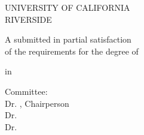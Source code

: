 \begin{titlepage}
    \begin{center}
    \null
        \vspace{0.2in} %
    
        UNIVERSITY OF CALIFORNIA \\
        RIVERSIDE
        
        \vfill
        
        \Title 
        
        \vspace{0.5in}
        
        A \DocumentType submitted in partial satisfaction\\
        of the requirements for the degree of
        
        
        \vspace{0.5in}
        
        \Degree
        
        \vspace{0.5in}
        in 
        \vspace{0.5in}
        
        \FieldofStudy
        
        \vspace{0.5in}
        
        \Author
        
        \vspace{0.5in}
        
        \ConferralDate 

    \end{center}
        \vspace{1.0in}
        \DocumentType{} Committee: \\
            \-\hspace{20pt} Dr. {\CommChair}, Chairperson \\
            \-\hspace{20pt} Dr. {\CommMembtwo} \\
            \-\hspace{20pt} Dr. {\CommMembthree} \\
\end{titlepage}